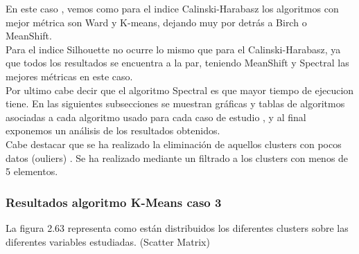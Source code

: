 	En este caso , vemos como para el indice Calinski-Harabasz los algoritmos con mejor métrica son 
	Ward y K-means, dejando muy por detrás a Birch o MeanShift.  \\

	Para el indice Silhouette no ocurre lo mismo que para el Calinski-Harabasz, ya que todos los resultados se encuentra a la par,
	teniendo MeanShift y Spectral las mejores métricas en este caso. \\

	Por ultimo cabe decir que el algoritmo Spectral es que mayor tiempo de ejecucion tiene. En las siguientes subsecciones
	se muestran gráficas y tablas de algoritmos asociadas a cada algoritmo usado para cada caso de estudio
	, y al final exponemos un análisis de los resultados obtenidos.\\

	Cabe destacar que se ha realizado la eliminación de aquellos clusters con pocos datos (ouliers) . Se ha realizado mediante un 
	filtrado a los clusters con menos de 5 elementos. \\


	\subsubsection{Resultados algoritmo K-Means caso 3}


	La figura 2.63 representa como están distribuidos los diferentes clusters sobre las diferentes variables estudiadas. (Scatter Matrix)\\

